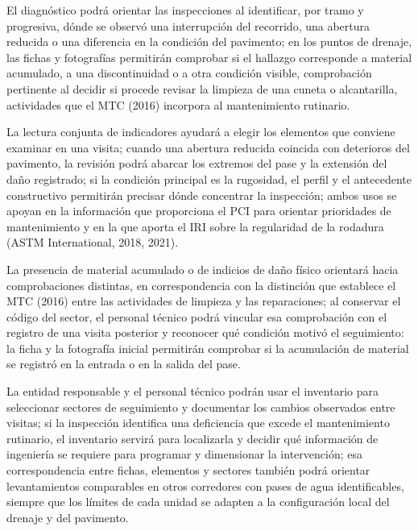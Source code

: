 
El diagnóstico podrá orientar las inspecciones al identificar, por tramo y progresiva, dónde se observó una interrupción del recorrido, una abertura reducida o una diferencia en la condición del pavimento; en los puntos de drenaje, las fichas y fotografías permitirán comprobar si el hallazgo corresponde a material acumulado, a una discontinuidad o a otra condición visible, comprobación pertinente al decidir si procede revisar la limpieza de una cuneta o alcantarilla, actividades que el MTC (2016) incorpora al mantenimiento rutinario.

La lectura conjunta de indicadores ayudará a elegir los elementos que conviene examinar en una visita; cuando una abertura reducida coincida con deterioros del pavimento, la revisión podrá abarcar los extremos del pase y la extensión del daño registrado; si la condición principal es la rugosidad, el perfil y el antecedente constructivo permitirán precisar dónde concentrar la inspección; ambos usos se apoyan en la información que proporciona el PCI para orientar prioridades de mantenimiento y en la que aporta el IRI sobre la regularidad de la rodadura (ASTM International, 2018, 2021).

La presencia de material acumulado o de indicios de daño físico orientará hacia comprobaciones distintas, en correspondencia con la distinción que establece el MTC (2016) entre las actividades de limpieza y las reparaciones; al conservar el código del sector, el personal técnico podrá vincular esa comprobación con el registro de una visita posterior y reconocer qué condición motivó el seguimiento: la ficha y la fotografía inicial permitirán comprobar si la acumulación de material se registró en la entrada o en la salida del pase.

La entidad responsable y el personal técnico podrán usar el inventario para seleccionar sectores de seguimiento y documentar los cambios observados entre visitas; si la inspección identifica una deficiencia que excede el mantenimiento rutinario, el inventario servirá para localizarla y decidir qué información de ingeniería se requiere para programar y dimensionar la intervención; esa correspondencia entre fichas, elementos y sectores también podrá orientar levantamientos comparables en otros corredores con pases de agua identificables, siempre que los límites de cada unidad se adapten a la configuración local del drenaje y del pavimento.
\endgroup
